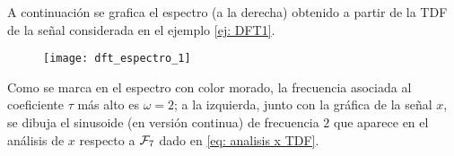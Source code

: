 \begin{ejemplo}
A continuación se grafica el espectro
(a la derecha) obtenido
a partir de la TDF de la señal considerada en el 
ejemplo \ref{ej: DFT1}.

\begin{figure}[H]
	\centering
	\texttt{[image: dft\_espectro\_1]} 
\end{figure}	

Como se marca en el espectro con color morado, la frecuencia
asociada al coeficiente $\tau$ más alto es $\omega =2$; a la
izquierda, junto con la gráfica de la señal 
$x$, se dibuja el sinusoide (en versión continua)
de frecuencia $2$ que aparece en el análisis de
$x$ respecto a $\mathcal{F}_{7}$ dado en 
\eqref{eq: analisis x TDF}.
\final
\end{ejemplo}